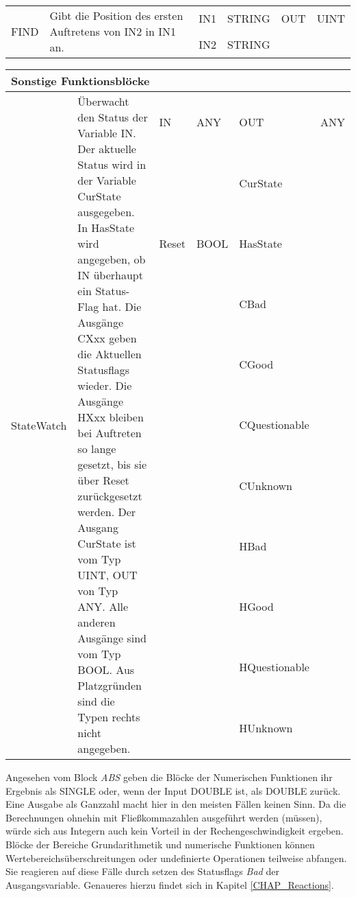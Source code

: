 {\begin{table}
\begin{tabular}{|m{2cm}|m{7cm}|>{\raggedright}m{0.5cm} >{\raggedleft}m{1.25cm}|>{\raggedright}m{0.5cm} >{\raggedleft\arraybackslash}m{1.25cm}|}
\hline
\multirow{2}{*}{FIND}&\multirow{2}{7cm}{Gibt die Position des ersten Auftretens von IN2 in IN1 an.}& IN1 & STRING & OUT & UINT\\
 & & IN2 & STRING & &\\
\hline
\end{tabular}
\renewcommand{\arraystretch}{1}
\end{table}
\begin{table}
\centering
\renewcommand{\arraystretch}{1.2}
\begin{tabular}{|m{2cm}|m{7cm}|>{\raggedright}m{0.5cm} >{\raggedleft}m{1.25cm}|>{\raggedright}m{0.5cm} >{\raggedleft\arraybackslash}m{1.25cm}|}
\hline
\multicolumn{6}{|l|}{\textbf{Sonstige Funktionsblöcke}}\\
\hline
\multirow{11}{*}{StateWatch}&\multirow{11}{7cm}{Überwacht den Status der Variable IN. Der aktuelle Status wird in der Variable CurState ausgegeben. In HasState wird angegeben, ob IN überhaupt ein Status-Flag hat. Die Ausgänge CXxx geben die Aktuellen Statusflags wieder. Die Ausgänge HXxx bleiben bei Auftreten so lange gesetzt, bis sie über Reset zurückgesetzt werden. Der Ausgang CurState ist vom Typ UINT, OUT von Typ ANY. Alle anderen Ausgänge sind vom Typ BOOL. Aus Platzgründen sind die Typen rechts nicht angegeben.}& IN & ANY & OUT & ANY\\
 & & & & CurState &\\ 
 & & Reset & BOOL & HasState &\\
 & & & & CBad &\\
 & & & & CGood &\\
 & & & & CQuestionable &\\
 & & & & CUnknown &\\
 & & & & HBad &\\
 & & & & HGood &\\
 & & & & HQuestionable &\\
 & & & & HUnknown &\\
\hline
\end{tabular}
\renewcommand{\arraystretch}{1}
\end{table}
}

Angesehen vom Block \textit{ABS} geben die Blöcke der Numerischen Funktionen ihr Ergebnis als SINGLE oder, wenn der Input DOUBLE ist, als DOUBLE zurück. Eine Ausgabe als Ganzzahl macht hier in den meisten Fällen keinen Sinn. Da die Berechnungen ohnehin mit Fließkommazahlen ausgeführt werden (müssen), würde sich aus Integern auch kein Vorteil in der Rechengeschwindigkeit ergeben.\\
Blöcke der Bereiche Grundarithmetik und numerische Funktionen können Wertebereichsüberschreitungen oder undefinierte Operationen teilweise abfangen. Sie reagieren auf diese Fälle durch setzen des Statusflags \textit{Bad} der Ausgangsvariable. Genaueres hierzu findet sich in Kapitel \ref{CHAP_Reactions}.\\

